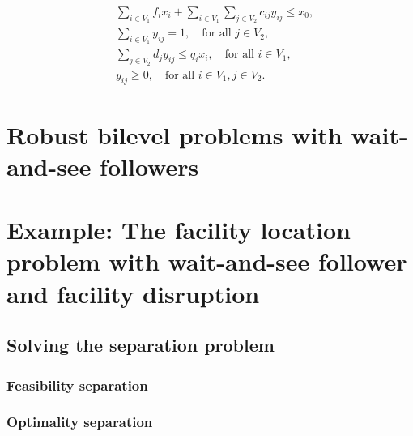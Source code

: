 \begin{subequations}
    \begin{align}
        & \sum_{i\in V_1} f_ix_i + \sum_{i\in V_1} \sum_{j\in V_2} c_{ij} y_{ij} \le x_0, \\
        & \sum_{i\in V_1} y_{ij} = 1, \quad \text{for all } j\in V_2, \\
        & \sum_{j\in V_2} d_jy_{ij} \le q_ix_i, \quad \text{for all } i\in V_1, \\
        & y_{ij} \ge 0, \quad \text{for all } i\in V_1, j\in V_2.
    \end{align}
\end{subequations}

\section{Robust bilevel problems with wait-and-see followers}

\section{Example: The facility location problem with wait-and-see follower and facility disruption}

\subsection{Solving the separation problem}

\subsubsection{Feasibility separation}

\subsubsection{Optimality separation}

